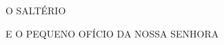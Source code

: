 \documentclass[12pt,oneside,openany]{scrbook}
\begin{document}


\begin{titlepage}
\begin{center}
\vfill
{\huge O SALTÉRIO\par}
\vfill
{\huge E O PEQUENO OFÍCIO DA NOSSA SENHORA\par}
\vfill
\end{center}
\end{titlepage}


\sloppy%


\tableofcontents%

\setlength{\columnseprule}{0pt}
\setlength{\columnsep}{3mm}


\newpage
\end{document}
